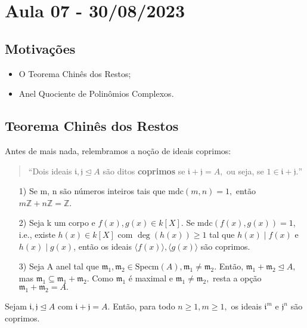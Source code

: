 \documentclass[algebraII_notes.tex]{subfiles}
\begin{document}
\section{Aula 07 - 30/08/2023}
\subsection{Motivações}
\begin{itemize}
	\item O Teorema Chinês dos Restos;
	\item Anel Quociente de Polinômios Complexos.
\end{itemize}
\subsection{Teorema Chinês dos Restos}
Antes de mais nada, relembramos a noção de ideais coprimos:
\begin{quote}
	``Dois ideais \(\mathfrak{i}, \mathfrak{j}\trianglelefteq{A}\) são ditos \textbf{coprimos} se \(\mathfrak{i}+\mathfrak{j} = A,\) ou seja,
	se \(1\in \mathfrak{i}+\mathfrak{j}.\)''
\end{quote}
\begin{example}
	\begin{itemize}
		\item[1)] Se m, n são números inteiros tais que \(\mathrm{mdc}(m, n) = 1,\) então \(m \mathbb{Z} + n \mathbb{Z} = \mathbb{Z}\).
		\item[2)] Seja k um corpo e \(f(x), g(x)\in k[X].\) Se \(\mathrm{mdc}(f(x), g(x)) = 1\), i.e.,
		      existe \(h(x)\in k[X]\) com \(\deg(h(x))\geq 1\) tal que \(h(x)\mid f(x)\) e \(h(x)\mid g(x)\), então os ideais
		      \(\langle f(x) \rangle, \langle g(x) \rangle\) são coprimos.
		\item[3)] Seja A anel tal que \(\mathfrak{m}_{1}, \mathfrak{m}_{2}\in \mathrm{Specm}(A), \mathfrak{m}_{1}\neq \mathfrak{m}_{2}.\) Então,
		      \(\mathfrak{m}_{1} + \mathfrak{m}_{2} \trianglelefteq{A},\) mas \(\mathfrak{m}_1\subseteq \mathfrak{m}_{1}+\mathfrak{m}_{2}.\)
		      Como \(\mathfrak{m}_{1}\) é maximal e \(\mathfrak{m}_{1}\neq \mathfrak{m}_{2},\) resta a opção \(\mathfrak{m}_{1} + \mathfrak{m}_{2} = A.\)
	\end{itemize}
\end{example}
\begin{prop*}
	Sejam \(\mathfrak{i}, \mathfrak{j}\trianglelefteq{A}\) com \(\mathfrak{i}+\mathfrak{j} = A.\) Então, para todo \(n\geq 1, m\geq 1,\) os ideais
	\(\mathfrak{i}^{m}\) e \(\mathfrak{j}^{n}\) são coprimos.
\end{prop*}
\end{document}
